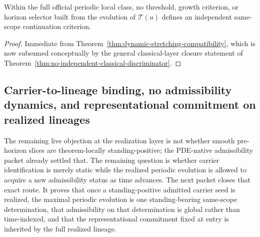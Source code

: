 \begin{corollary}
\label{cor:no-stretching-based-continuation-gate}
Within the full official periodic local class, no threshold, growth criterion, or horizon selector built
from the evolution of $\mathcal T(u)$ defines an independent same-scope continuation criterion.
\end{corollary}

\begin{proof}
Immediate from Theorem~\ref{thm:dynamic-stretching-compatibility}, which is now subsumed conceptually by the general classical-layer closure statement of Theorem~\ref{thm:no-independent-classical-discriminator}.
\end{proof}

\subsection{Carrier-to-lineage binding, no admissibility dynamics, and representational commitment on realized lineages}
\label{subsec:standing-conservation-realized-lineages}
The remaining live objection at the realization layer is not whether smooth pre-horizon slices are theorem-locally standing-positive; the PDE-native admissibility packet already settled that. The remaining question is whether carrier identification is merely static while the realized periodic evolution is allowed to acquire a new admissibility status as time advances. The next packet closes that exact route. It proves that once a standing-positive admitted carrier seed is realized, the maximal periodic evolution is one standing-bearing same-scope determination, that admissibility on that determination is global rather than time-indexed, and that the representational commitment fixed at entry is inherited by the full realized lineage.

